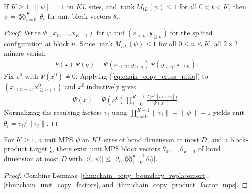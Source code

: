 \begin{lemma}
    \label{thm:chain_unit_copy_factors}
    \leanok
    If $K\ge1$, $\|\psi\|=1$ on $KL$ sites, and
    $\operatorname{rank}M_{tL}(\psi)\le1$ for all $0<t<K$, then
    $\psi=\bigotimes_{i=0}^{K-1}\theta_i$ for unit block vectors $\theta_i$.
\end{lemma}
\begin{proof}\leanok
    Write $\Psi(x_0,\dots,x_{K-1})$ for $\psi$ and $(x_{<n},y_{\ge n})$ for the
    spliced configuration at block $n$. Since $\operatorname{rank}M_{nL}(\psi)\le1$
    for all $0\le n\le K$, all $2\times2$ minors vanish:
    \begin{align}
        \label{eq:chain_copy_cross_ratio}
        \Psi(x)\,\Psi(y)=\Psi(x_{<n},y_{\ge n})\,\Psi(y_{<n},x_{\ge n}).
    \end{align}
    Fix $x^0$ with $\Psi(x^0)\neq0$. Applying (\ref{eq:chain_copy_cross_ratio})
    to $(x_{<n+1},x^0_{\ge n+1})$ and $x^0$ inductively gives
    \begin{align}
        \label{eq:chain_copy_coefficient_factorization}
        \Psi(x)=\Psi(x^0)\prod_{i=0}^{K-1}
        \frac{\Psi\bigl(x^0[i\mapsto x_i]\bigr)}{\Psi(x^0)}.
    \end{align}
    Normalizing the resulting factors $v_i$ using
    $\prod_{i=0}^{K-1}\|v_i\|=\|\psi\|=1$ yields unit $\theta_i=v_i/\|v_i\|$.
\end{proof}

\begin{lemma}
    \label{thm:chain_unit_mps_copy_replacement}
    \leanok
    For $K\ge1$, a unit MPS $\psi$ on $KL$ sites of bond dimension at most $D$,
    and a block-product target $\xi$, there exist unit MPS block vectors
    $\theta_0,\dots,\theta_{K-1}$ of bond dimension at most $D$ with
    $|\langle\xi,\psi\rangle|\le\bigl|\bigl\langle\xi,\bigotimes_{i=0}^{K-1}\theta_i\bigr\rangle\bigr|$.
\end{lemma}
\begin{proof}\leanok
    Combine Lemmas~\ref{thm:chain_copy_boundary_replacement},
    \ref{thm:chain_unit_copy_factors}, and~\ref{thm:chain_copy_product_factor_mps}.
\end{proof}

